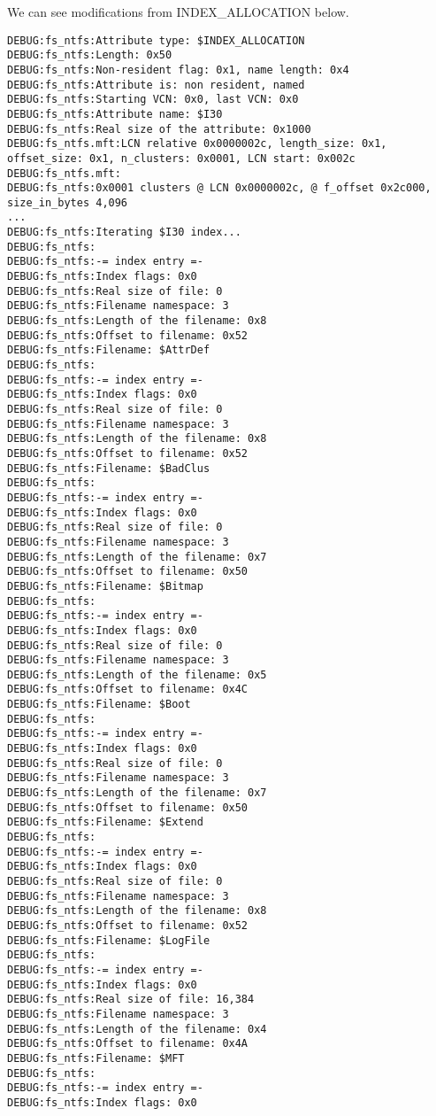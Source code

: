 \documentclass[12pt]{article}
\begin{document}
We can see modifications from INDEX\_ALLOCATION below.
\begin{verbatim}
DEBUG:fs_ntfs:Attribute type: $INDEX_ALLOCATION
DEBUG:fs_ntfs:Length: 0x50
DEBUG:fs_ntfs:Non-resident flag: 0x1, name length: 0x4
DEBUG:fs_ntfs:Attribute is: non resident, named
DEBUG:fs_ntfs:Starting VCN: 0x0, last VCN: 0x0
DEBUG:fs_ntfs:Attribute name: $I30
DEBUG:fs_ntfs:Real size of the attribute: 0x1000
DEBUG:fs_ntfs.mft:LCN relative 0x0000002c, length_size: 0x1,
offset_size: 0x1, n_clusters: 0x0001, LCN start: 0x002c
DEBUG:fs_ntfs.mft:
DEBUG:fs_ntfs:0x0001 clusters @ LCN 0x0000002c, @ f_offset 0x2c000,
size_in_bytes 4,096
...
DEBUG:fs_ntfs:Iterating $I30 index...
DEBUG:fs_ntfs:
DEBUG:fs_ntfs:-= index entry =-
DEBUG:fs_ntfs:Index flags: 0x0
DEBUG:fs_ntfs:Real size of file: 0
DEBUG:fs_ntfs:Filename namespace: 3
DEBUG:fs_ntfs:Length of the filename: 0x8
DEBUG:fs_ntfs:Offset to filename: 0x52
DEBUG:fs_ntfs:Filename: $AttrDef
DEBUG:fs_ntfs:
DEBUG:fs_ntfs:-= index entry =-
DEBUG:fs_ntfs:Index flags: 0x0
DEBUG:fs_ntfs:Real size of file: 0
DEBUG:fs_ntfs:Filename namespace: 3
DEBUG:fs_ntfs:Length of the filename: 0x8
DEBUG:fs_ntfs:Offset to filename: 0x52
DEBUG:fs_ntfs:Filename: $BadClus
DEBUG:fs_ntfs:
DEBUG:fs_ntfs:-= index entry =-
DEBUG:fs_ntfs:Index flags: 0x0
DEBUG:fs_ntfs:Real size of file: 0
DEBUG:fs_ntfs:Filename namespace: 3
DEBUG:fs_ntfs:Length of the filename: 0x7
DEBUG:fs_ntfs:Offset to filename: 0x50
DEBUG:fs_ntfs:Filename: $Bitmap
DEBUG:fs_ntfs:
DEBUG:fs_ntfs:-= index entry =-
DEBUG:fs_ntfs:Index flags: 0x0
DEBUG:fs_ntfs:Real size of file: 0
DEBUG:fs_ntfs:Filename namespace: 3
DEBUG:fs_ntfs:Length of the filename: 0x5
DEBUG:fs_ntfs:Offset to filename: 0x4C
DEBUG:fs_ntfs:Filename: $Boot
DEBUG:fs_ntfs:
DEBUG:fs_ntfs:-= index entry =-
DEBUG:fs_ntfs:Index flags: 0x0
DEBUG:fs_ntfs:Real size of file: 0
DEBUG:fs_ntfs:Filename namespace: 3
DEBUG:fs_ntfs:Length of the filename: 0x7
DEBUG:fs_ntfs:Offset to filename: 0x50
DEBUG:fs_ntfs:Filename: $Extend
DEBUG:fs_ntfs:
DEBUG:fs_ntfs:-= index entry =-
DEBUG:fs_ntfs:Index flags: 0x0
DEBUG:fs_ntfs:Real size of file: 0
DEBUG:fs_ntfs:Filename namespace: 3
DEBUG:fs_ntfs:Length of the filename: 0x8
DEBUG:fs_ntfs:Offset to filename: 0x52
DEBUG:fs_ntfs:Filename: $LogFile
DEBUG:fs_ntfs:
DEBUG:fs_ntfs:-= index entry =-
DEBUG:fs_ntfs:Index flags: 0x0
DEBUG:fs_ntfs:Real size of file: 16,384
DEBUG:fs_ntfs:Filename namespace: 3
DEBUG:fs_ntfs:Length of the filename: 0x4
DEBUG:fs_ntfs:Offset to filename: 0x4A
DEBUG:fs_ntfs:Filename: $MFT
DEBUG:fs_ntfs:
DEBUG:fs_ntfs:-= index entry =-
DEBUG:fs_ntfs:Index flags: 0x0

\end{verbatim}
\end{document}
